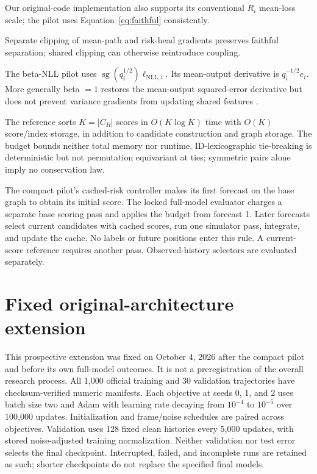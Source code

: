 Our original-code implementation also supports its conventional $R_i$ mean-loss scale; the pilot uses Equation~\ref{eq:faithful} consistently.

Separate clipping of mean-path and risk-head gradients preserves faithful separation; shared clipping can otherwise reintroduce coupling.

The beta-NLL pilot uses
$\operatorname{sg}(q_i^{1/2})\ell_{\mathrm{NLL},i}$.
Its mean-output derivative is $q_i^{-1/2}e_i$. More generally beta $=1$ restores the mean-output squared-error derivative but does not prevent variance gradients from updating shared features \citep{stirn2023}.

The reference sorts $K=|C_R|$ scores in $O(K\log K)$ time with $O(K)$ score/index storage, in addition to candidate construction and graph storage. The budget bounds neither total memory nor runtime. ID-lexicographic tie-breaking is deterministic but not permutation equivariant at ties; symmetric pairs alone imply no conservation law.

The compact pilot's cached-risk controller makes its first forecast on the base graph to obtain its initial score. The locked full-model evaluator charges a separate base scoring pass and applies the budget from forecast 1. Later forecasts select current candidates with cached scores, run one simulator pass, integrate, and update the cache. No labels or future positions enter this rule. A current-score reference requires another pass. Observed-history selectors are evaluated separately.

\section{Fixed original-architecture extension}
\label{sec:full-protocol}
This prospective extension was fixed on October 4, 2026 after the compact pilot
and before its own full-model outcomes. It is not a preregistration of the
overall research process. All 1,000 official training and 30 validation
trajectories have checksum-verified numeric manifests. Each objective at seeds
0, 1, and 2 uses batch size two and Adam with learning rate decaying from
$10^{-4}$ to $10^{-5}$ over 100,000 updates. Initialization and frame/noise
schedules are paired across objectives. Validation uses 128 fixed clean
histories every 5,000 updates, with stored noise-adjusted training normalization.
Neither validation nor test error selects the final checkpoint. Interrupted,
failed, and incomplete runs are retained as such; shorter checkpoints do not
replace the specified final models.

